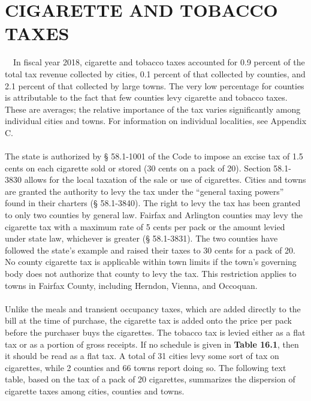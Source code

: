 \documentclass[
]{book}
\begin{document}
\hypertarget{cigarette-and-tobacco-taxes}{%
\section{CIGARETTE AND TOBACCO TAXES}\label{cigarette-and-tobacco-taxes}}

~~In fiscal year 2018, cigarette and tobacco taxes accounted for 0.9 percent of the total tax revenue collected by cities, 0.1 percent of that collected by counties, and 2.1 percent of that collected by large towns. The very low percentage for counties is attributable to the fact that few counties levy cigarette and tobacco taxes. These are averages; the relative importance of the tax varies significantly among individual cities and towns. For information on individual localities, see Appendix C.\\
~\\
\hspace*{0.333em}\hspace*{0.333em}The state is authorized by § 58.1-1001 of the Code to impose an excise tax of 1.5 cents on each cigarette sold or stored (30 cents on a pack of 20). Section 58.1-3830 allows for the local taxation of the sale or use of cigarettes. Cities and towns are granted the authority to levy the tax under the ``general taxing powers'' found in their charters (§ 58.1-3840). The right to levy the tax has been granted to only two counties by general law. Fairfax and Arlington counties may levy the cigarette tax with a maximum rate of 5 cents per pack or the amount levied under state law, whichever is greater (§ 58.1-3831). The two counties have followed the state's example and raised their taxes to 30 cents for a pack of 20. No county cigarette tax is applicable within town limits if the town's governing body does not authorize that county to levy the tax. This restriction applies to towns in Fairfax County, including Herndon, Vienna, and Occoquan.\\
~\\
\hspace*{0.333em}\hspace*{0.333em}Unlike the meals and transient occupancy taxes, which are added directly to the bill at the time of purchase, the cigarette tax is added onto the price per pack before the purchaser buys the cigarettes. The tobacco tax is levied either as a flat tax or as a portion of gross receipts. If no schedule is given in \textbf{Table 16.1}, then it should be read as a flat tax. A total of 31 cities levy some sort of tax on cigarettes, while 2 counties and 66 towns report doing so. The following text table, based on the tax of a pack of 20 cigarettes, summarizes the dispersion of cigarette taxes among cities, counties and towns.
\end{document}
